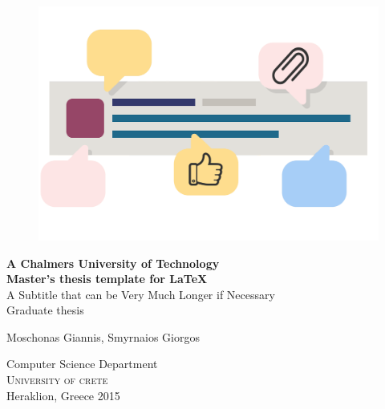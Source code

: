 
\begin{titlepage}
			
\addtolength{\voffset}{2cm}

\begin{figure}[H]
\centering
\vspace{2cm}	%
\includegraphics[width=0.9\linewidth]{figure/front_image.png}
\end{figure}

\mbox{}
\vfill
\renewcommand{\familydefault}{\sfdefault} \normalfont %
\textbf{{\Huge 	A Chalmers University of Technology 	\\[0.2cm] 
				Master's thesis template for \LaTeX}} 	\\[0.5cm]
{\Large A Subtitle that can be Very Much Longer if Necessary}\\[0.5cm]
Graduate thesis \setlength{\parskip}{1cm}

{\Large Moschonas Giannis, Smyrnaios Giorgos} \setlength{\parskip}{2.9cm}

Computer Science Department \\
\textsc{University of crete} \\
Heraklion, Greece 2015

\renewcommand{\familydefault}{\rmdefault} \normalfont %
\end{titlepage}


\newpage
\restoregeometry
\thispagestyle{empty}
\mbox{}


